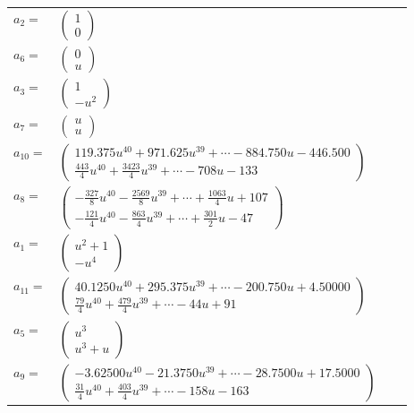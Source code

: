 \documentclass[1p]{elsarticle_modified}
\theoremstyle{definition}
\begin{document}
\begin{tabular}{m{7pt} m{180pt} m{7pt} m{180pt} }
\flushright $a_{2}=$&$\begin{pmatrix}1\\0\end{pmatrix}$ \\
\flushright $a_{6}=$&$\begin{pmatrix}0\\u\end{pmatrix}$ \\
\flushright $a_{3}=$&$\begin{pmatrix}1\\- u^2\end{pmatrix}$ \\
\flushright $a_{7}=$&$\begin{pmatrix}u\\u\end{pmatrix}$ \\
\flushright $a_{10}=$&$\begin{pmatrix}119.375 u^{40}+971.625 u^{39}+\cdots-884.750 u-446.500\\\frac{443}{4} u^{40}+\frac{3423}{4} u^{39}+\cdots-708 u-133\end{pmatrix}$ \\
\flushright $a_{8}=$&$\begin{pmatrix}-\frac{327}{8} u^{40}-\frac{2569}{8} u^{39}+\cdots+\frac{1063}{4} u+107\\-\frac{121}{4} u^{40}-\frac{863}{4} u^{39}+\cdots+\frac{301}{2} u-47\end{pmatrix}$ \\
\flushright $a_{1}=$&$\begin{pmatrix}u^2+1\\- u^4\end{pmatrix}$ \\
\flushright $a_{11}=$&$\begin{pmatrix}40.1250 u^{40}+295.375 u^{39}+\cdots-200.750 u+4.50000\\\frac{79}{4} u^{40}+\frac{479}{4} u^{39}+\cdots-44 u+91\end{pmatrix}$ \\
\flushright $a_{5}=$&$\begin{pmatrix}u^3\\u^3+u\end{pmatrix}$ \\
\flushright $a_{9}=$&$\begin{pmatrix}-3.62500 u^{40}-21.3750 u^{39}+\cdots-28.7500 u+17.5000\\\frac{31}{4} u^{40}+\frac{403}{4} u^{39}+\cdots-158 u-163\end{pmatrix}$ \\

\end{tabular}
\end{document}
